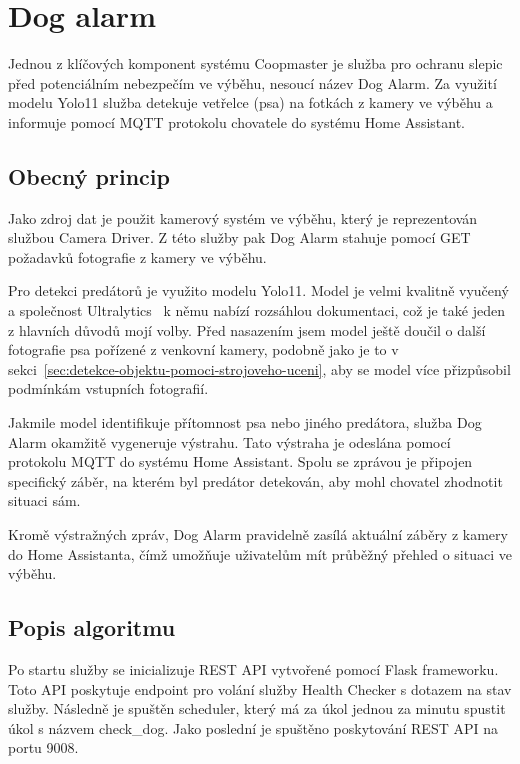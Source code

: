 \section{Dog alarm}\label{sec:dog-alarm}
Jednou z klíčových komponent systému Coopmaster je služba pro ochranu slepic před potenciálním nebezpečím ve výběhu, nesoucí název Dog Alarm.
Za využití modelu Yolo11 služba detekuje vetřelce (psa) na fotkách z kamery ve výběhu a informuje pomocí MQTT protokolu chovatele do systému Home Assistant.

\subsection*{Obecný princip}
Jako zdroj dat je použit kamerový systém ve výběhu, který je reprezentován službou Camera Driver.
Z této služby pak Dog Alarm stahuje pomocí GET požadavků fotografie z kamery ve výběhu.

Pro detekci predátorů je využito modelu Yolo11.
Model je velmi kvalitně vyučený a společnost Ultralytics~\cite{ultralytics_yolo} k němu nabízí rozsáhlou dokumentaci, což je také jeden z hlavních důvodů mojí volby.
Před nasazením jsem model ještě doučil o další fotografie psa pořízené z venkovní kamery, podobně jako je to v sekci~\ref{sec:detekce-objektu-pomoci-strojoveho-uceni}, aby se model více přizpůsobil podmínkám vstupních fotografií.

Jakmile model identifikuje přítomnost psa nebo jiného predátora, služba Dog Alarm okamžitě vygeneruje výstrahu.
Tato výstraha je odeslána pomocí protokolu MQTT do systému Home Assistant.
Spolu se zprávou je připojen specifický záběr, na kterém byl predátor detekován, aby mohl chovatel zhodnotit situaci sám.

Kromě výstražných zpráv, Dog Alarm pravidelně zasílá aktuální záběry z kamery do Home Assistanta, čímž umožňuje uživatelům mít průběžný přehled o situaci ve výběhu.

\subsection*{Popis algoritmu}
Po startu služby se inicializuje REST API vytvořené pomocí Flask frameworku.
Toto API poskytuje endpoint pro volání služby Health Checker s dotazem na stav služby.
Následně je spuštěn scheduler, který má za úkol jednou za minutu spustit úkol s názvem check\_dog.
Jako poslední je spuštěno poskytování REST API na portu 9008.\newline

